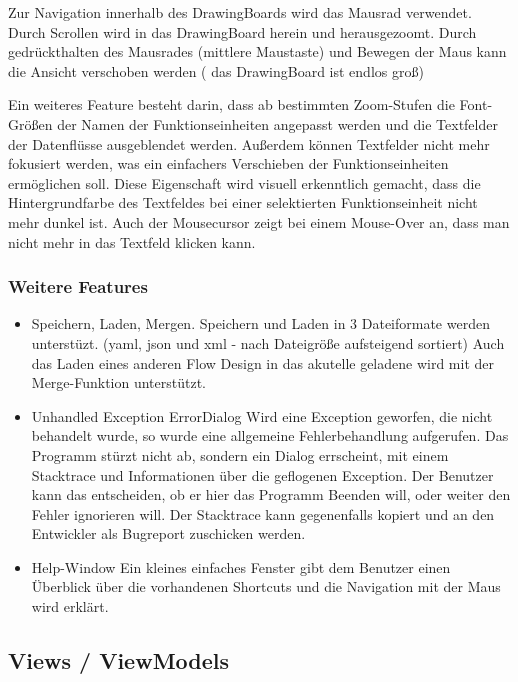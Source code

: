 	Zur Navigation innerhalb des DrawingBoards wird das Mausrad verwendet.
	Durch Scrollen wird in das DrawingBoard herein und herausgezoomt.
	Durch gedrückthalten des Mausrades (mittlere Maustaste) und Bewegen der
	Maus kann die Ansicht verschoben werden ( das DrawingBoard ist endlos groß)
	
	Ein weiteres Feature besteht darin, dass ab bestimmten Zoom-Stufen die
	Font-Größen der Namen der Funktionseinheiten angepasst werden und die 
	Textfelder der Datenflüsse ausgeblendet werden.
	Außerdem können Textfelder nicht mehr fokusiert werden, was ein einfachers
	Verschieben der Funktionseinheiten ermöglichen soll. Diese Eigenschaft wird
	visuell erkenntlich gemacht, dass die Hintergrundfarbe des Textfeldes bei
	einer selektierten Funktionseinheit nicht mehr dunkel ist.
	Auch der Mousecursor zeigt bei einem Mouse-Over an, dass man nicht mehr in
	das Textfeld klicken kann.
	
	
	\subsubsection{Weitere Features}

	\begin{itemize}
		\item Speichern, Laden, Mergen.
		Speichern und Laden in 3 Dateiformate werden unterstüzt.
		(yaml, json und xml - nach Dateigröße aufsteigend sortiert)
		Auch das Laden eines anderen Flow Design in das akutelle geladene wird 
		mit der Merge-Funktion unterstützt.

		\item Unhandled Exception ErrorDialog
		Wird eine Exception geworfen, die nicht behandelt wurde, so wurde eine
		allgemeine Fehlerbehandlung aufgerufen. Das Programm stürzt nicht ab,
		sondern ein Dialog errscheint, mit einem Stacktrace und Informationen
		über die geflogenen Exception. Der Benutzer kann das entscheiden, ob er
		hier das Programm Beenden will, oder weiter den Fehler ignorieren will.
		Der Stacktrace kann gegenenfalls kopiert und an den Entwickler als
		Bugreport zuschicken werden.
		
		\item Help-Window
		Ein kleines einfaches Fenster gibt dem Benutzer einen Überblick über die
		vorhandenen Shortcuts und die Navigation mit der Maus wird erklärt.
	\end{itemize}
	



\subsection{Views / ViewModels}

